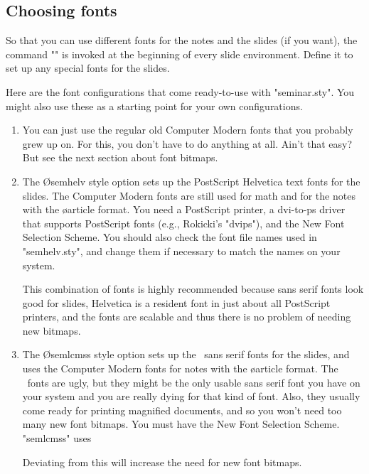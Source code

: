 \begin{slide}
\section{Choosing fonts\label{fonts}}

So that you can use different fonts for the notes and the slides (if you
want), the command "\slidefonts" is invoked at the beginning of every slide
environment. Define it to set up any special fonts for the slides.

Here are the font configurations that come ready-to-use with "seminar.sty".
You might also use these as a starting point for your own configurations.
\begin{enumerate}
\item You can just use the regular old Computer Modern fonts that you probably
grew up on. For this, you don't have to do anything at all. Ain't that easy?
But see the next section about font bitmaps.

\item The \O{semhelv} style option sets up the PostScript Helvetica text fonts
for the slides. The Computer Modern fonts are still used for math and for the
notes with the \o{article} format. You need a PostScript printer, a dvi-to-ps
driver that supports PostScript fonts (e.g., Rokicki's "dvips"), and the New
Font Selection Scheme. You should also check the font file names used in
"semhelv.sty", and change them if necessary to match the names on your system.

This combination of fonts is highly recommended because sans serif fonts look
good for slides, Helvetica is a resident font in just about all PostScript
printers, and the fonts are scalable and thus there is no problem of needing
new bitmaps.

\item The \O{semlcmss} style option sets up the \SliTeX\ sans serif fonts for
the slides, and uses the Computer Modern fonts for notes with the \o{article}
format. The \SliTeX\ fonts are ugly, but they might be the only usable sans
serif font you have on your system and you are really dying for that kind of
font. Also, they usually come ready for printing magnified documents, and so
you won't need too many new font bitmaps. You must have the New Font Selection
Scheme. "semlcmss" uses
\begin{LVerbatim}
\end{LVerbatim}
Deviating from this will increase the need for new font bitmaps.
\end{enumerate}


\end{slide}

